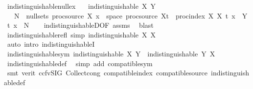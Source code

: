 \begin{isabellebody}
\endisatagproof
{\isafoldproof}%
%
\isadelimproof
\isanewline
%
\endisadelimproof
\isanewline
{}\isamarkupfalse%
\ indistinguishable{\isacharunderscore}{\kern0pt}null{\isacharunderscore}{\kern0pt}ex{\isacharcolon}{\kern0pt}\isanewline
\ \ \ {\isachardoublequoteopen}indistinguishable\ X\ Y{\isachardoublequoteclose}\isanewline
\ \ \ {\isachardoublequoteopen}{\isasymexists}N\ {\isasymin}\ null{\isacharunderscore}{\kern0pt}sets\ {\isacharparenleft}{\kern0pt}proc{\isacharunderscore}{\kern0pt}source\ X{\isacharparenright}{\kern0pt}{\isachardot}{\kern0pt}\ {\isacharbraceleft}{\kern0pt}x\ {\isasymin}\ space\ {\isacharparenleft}{\kern0pt}proc{\isacharunderscore}{\kern0pt}source\ X{\isacharparenright}{\kern0pt}{\isachardot}{\kern0pt}{\isasymexists}t\ {\isasymin}\ proc{\isacharunderscore}{\kern0pt}index\ X{\isachardot}{\kern0pt}\ X\ t\ x\ {\isasymnoteq}\ Y\ t\ x{\isacharbraceright}{\kern0pt}\ {\isasymsubseteq}\ N{\isachardoublequoteclose}\isanewline
%
\isadelimproof
\ \ %
\endisadelimproof
%
\isatagproof
{}\isamarkupfalse%
\ indistinguishableD{\isacharparenleft}{\kern0pt}{}{\isacharparenright}{\kern0pt}{\isacharbrackleft}{\kern0pt}OF\ assms{\isacharbrackright}{\kern0pt}\ \isamarkupfalse%
\ blast%
\endisatagproof
{\isafoldproof}%
%
\isadelimproof
\isanewline
%
\endisadelimproof
\isanewline
{}\isamarkupfalse%
\ indistinguishable{\isacharunderscore}{\kern0pt}refl\ {\isacharbrackleft}{\kern0pt}simp{\isacharbrackright}{\kern0pt}{\isacharcolon}{\kern0pt}\ {\isachardoublequoteopen}indistinguishable\ X\ X{\isachardoublequoteclose}\isanewline
%
\isadelimproof
\ \ %
\endisadelimproof
%
\isatagproof
{}\isamarkupfalse%
\ {\isacharparenleft}{\kern0pt}auto\ intro{\isacharcolon}{\kern0pt}\ indistinguishableI{\isacharparenright}{\kern0pt}%
\endisatagproof
{\isafoldproof}%
%
\isadelimproof
\isanewline
%
\endisadelimproof
\isanewline
{}\isamarkupfalse%
\ indistinguishable{\isacharunderscore}{\kern0pt}sym{\isacharcolon}{\kern0pt}\ {\isachardoublequoteopen}indistinguishable\ X\ Y\ {\isasymLongrightarrow}\ indistinguishable\ Y\ X{\isachardoublequoteclose}\isanewline
%
\isadelimproof
\ \ %
\endisadelimproof
%
\isatagproof
{}\isamarkupfalse%
\ indistinguishable{\isacharunderscore}{\kern0pt}def\ \isamarkupfalse%
\ {\isacharparenleft}{\kern0pt}simp\ add{\isacharcolon}{\kern0pt}\ compatible{\isacharunderscore}{\kern0pt}sym{\isacharparenright}{\kern0pt}\isanewline
\ \ \isamarkupfalse%
\ {\isacharparenleft}{\kern0pt}smt\ {\isacharparenleft}{\kern0pt}verit{\isacharcomma}{\kern0pt}\ ccfv{\isacharunderscore}{\kern0pt}SIG{\isacharparenright}{\kern0pt}\ Collect{\isacharunderscore}{\kern0pt}cong\ compatible{\isacharunderscore}{\kern0pt}index\ compatible{\isacharunderscore}{\kern0pt}source\ indistinguishable{\isacharunderscore}{\kern0pt}def{\isacharparenright}{\kern0pt}%

\end{isabellebody}
